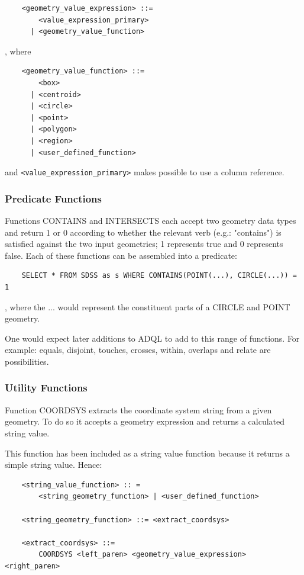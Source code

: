 \documentclass[11pt,a4paper]{ivoa}
\begin{document}
\begin{verbatim}
    <geometry_value_expression> ::= 
        <value_expression_primary>
      | <geometry_value_function>
\end{verbatim}

, where

\begin{verbatim}
    <geometry_value_function> ::=
        <box>
      | <centroid>
      | <circle>
      | <point>
      | <polygon>
      | <region>
      | <user_defined_function>
\end{verbatim}

and \verb:<value_expression_primary>: makes possible to use a column reference.

\subsubsection{Predicate Functions}
\label{sec:geom.functions.predicate}

Functions CONTAINS and INTERSECTS each accept two geometry data types
and return 1 or 0 according to whether the relevant verb (e.g.: "contains") is
satisfied against the two input geometries; 1 represents true and 0 represents
false. Each of these functions can be assembled into a predicate:

\begin{verbatim}
    SELECT * FROM SDSS as s WHERE CONTAINS(POINT(...), CIRCLE(...)) = 1
\end{verbatim}

, where the ... would represent the constituent parts of a CIRCLE and POINT
geometry.

One would expect later additions to ADQL to add to this range of functions. For
example: equals, disjoint, touches, crosses, within, overlaps and relate
are possibilities.

\subsubsection{Utility Functions}
\label{sec:geom.functions.utility}

Function COORDSYS extracts the coordinate system string from a given
geometry. To do so it accepts a geometry expression and returns a calculated
string value.

This function has been included as a string value function because it
returns a simple string value. Hence:

\begin{verbatim}
    <string_value_function> :: =
        <string_geometry_function> | <user_defined_function>

    <string_geometry_function> ::= <extract_coordsys>

    <extract_coordsys> ::=
        COORDSYS <left_paren> <geometry_value_expression> <right_paren>
\end{verbatim}
\end{document}
